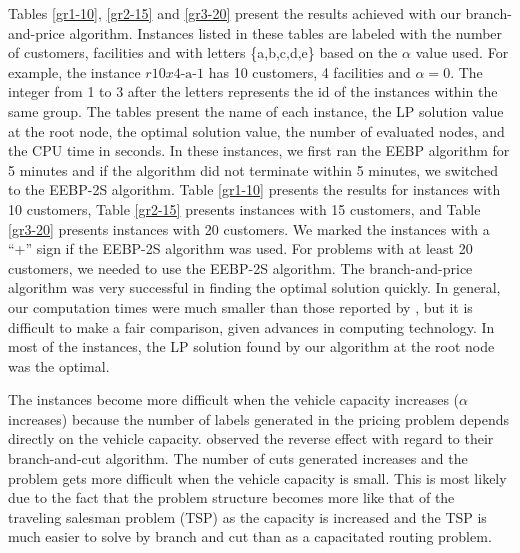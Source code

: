 \documentclass[graybox]{./styles/svmult}
\begin{document}
Tables \ref{gr1-10}, \ref{gr2-15} and \ref{gr3-20} present the results
achieved with our branch-and-price algorithm. Instances listed in
these tables are labeled with the number of customers, facilities and
with letters \{a,b,c,d,e\} based on the $\alpha$ value used. For
example, the instance $r10x\textrm{4-a-1}$ has 10 customers, 4 facilities and
$\alpha = 0$. The integer from 1 to 3 after the letters represents the id
of the instances within the same group. The tables present the name of each
instance, the LP solution value at the root node, the optimal solution
value, the number of evaluated nodes, and the CPU time in seconds. In
these instances, we first ran the EEBP algorithm for 5 minutes and if
the algorithm did not terminate within 5 minutes, we switched to the
EEBP-2S algorithm. Table \ref{gr1-10} presents the results for
instances with 10 customers, Table \ref{gr2-15} presents instances
with 15 customers, and Table \ref{gr3-20} presents instances with 20
customers. We marked the instances with a ``+'' sign if the EEBP-2S
algorithm was used. For problems with at least 20 customers, we needed
to use the EEBP-2S algorithm. The branch-and-price algorithm was very
successful in finding the optimal solution quickly. 
In general, our computation times were much smaller than those
reported by \citet{Laporte86}, but it is difficult to make a fair
comparison, given advances in computing technology. In most of the
instances, the LP solution found by our algorithm at the root node was
the optimal.

The instances become more difficult when the vehicle capacity
increases ($\alpha$ increases) because the number of labels
generated in the pricing problem depends directly on the vehicle
capacity. \citet{Laporte86} observed the reverse effect with regard to
their branch-and-cut algorithm. The number of cuts generated increases
and the problem gets more difficult when the vehicle capacity is
small. This is most likely due to the fact that the problem structure
becomes more like that of the traveling salesman problem (TSP) as the
capacity is increased and the TSP is much easier to solve by branch
and cut than as a capacitated routing problem.
\end{document}
